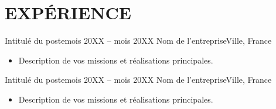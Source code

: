 \section{EXPÉRIENCE}
\resumeSubHeadingListStart

\resumeSubheading
  {Intitulé du poste}{mois 20XX -- mois 20XX}
  {Nom de l'entreprise}{Ville, France}
  \begin{itemize}[leftmargin=0.12in, label={}, itemsep=0pt]
    \item \small Description de vos missions et réalisations principales.
  \end{itemize}

\vspace{-4pt}

\resumeSubheading
  {Intitulé du poste}{mois 20XX -- mois 20XX}
  {Nom de l'entreprise}{Ville, France}
  \begin{itemize}[leftmargin=0.12in, label={}, itemsep=0pt]
    \item \small Description de vos missions et réalisations principales.
  \end{itemize}

\resumeSubHeadingListEnd
